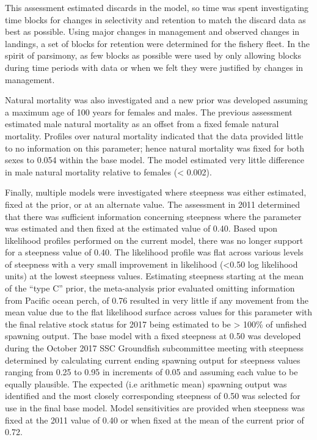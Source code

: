 \documentclass[12pt,]{article}
\begin{document}
This assessment estimated discards in the model, so time was spent
investigating time blocks for changes in selectivity and retention to
match the discard data as best as possible. Using major changes in
management and observed changes in landings, a set of blocks for
retention were determined for the fishery fleet. In the spirit of
parsimony, as few blocks as possible were used by only allowing blocks
during time periods with data or when we felt they were justified by
changes in management.

Natural mortality was also investigated and a new prior was developed
assuming a maximum age of 100 years for females and males. The previous
assessment estimated male natural mortality as an offset from a fixed
female natural mortality. Profiles over natural mortality indicated that
the data provided little to no information on this parameter; hence
natural mortality was fixed for both sexes to 0.054 within the base
model. The model estimated very little difference in male natural
mortality relative to females (\textless{} 0.002).

Finally, multiple models were investigated where steepness was either
estimated, fixed at the prior, or at an alternate value. The assessment
in 2011 determined that there was sufficient information concerning
steepness where the parameter was estimated and then fixed at the
estimated value of 0.40. Based upon likelihood profiles performed on the
current model, there was no longer support for a steepness value of
0.40. The likelihood profile was flat across various levels of steepness
with a very small improvement in likelihood (\textless{}0.50 log
likelihood units) at the lowest steepness values. Estimating steepness
starting at the mean of the ``type C'' prior, the meta-analysis prior
evaluated omitting information from Pacific ocean perch, of 0.76
resulted in very little if any movement from the mean value due to the
flat likelihood surface across values for this parameter with the final
relative stock status for 2017 being estimated to be \textgreater{}
100\% of unfished spawning output. The base model with a fixed steepness
at 0.50 was developed during the October 2017 SSC Groundfish
subcommittee meeting with steepness determined by calculating current
ending spawning output for steepness values ranging from 0.25 to 0.95 in
increments of 0.05 and assuming each value to be equally plausible. The
expected (i.e arithmetic mean) spawning output was identified and the
most closely corresponding steepness of 0.50 was selected for use in the
final base model. Model sensitivities are provided when steepness was
fixed at the 2011 value of 0.40 or when fixed at the mean of the current
prior of 0.72.
\end{document}
